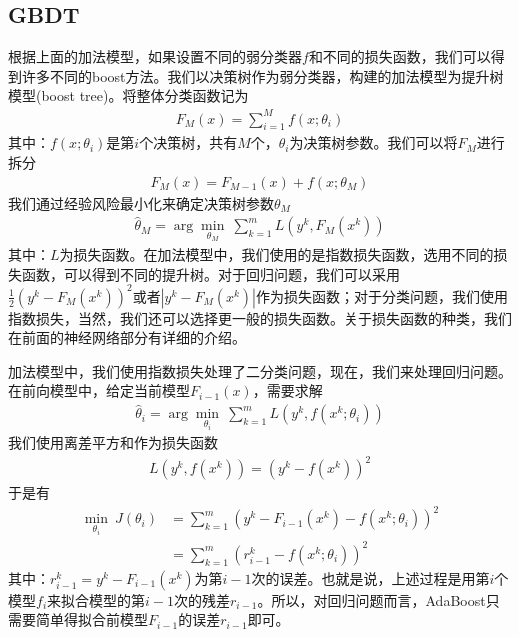       \subsection{GBDT}
          \par
          根据上面的加法模型，如果设置不同的弱分类器$f$和不同的损失函数，我们可以得到许多不同的boost方法。我们以决策树作为弱分类器，构建的加法模型为提升树模型(boost tree)。将整体分类函数记为
          \begin{align*}
          F_M(x) = \sum_{i=1}^M f(x;\theta_i)
          \end{align*}
          其中：$f(x;\theta_i)$是第$i$个决策树，共有$M$个，$\theta_i$为决策树参数。我们可以将$F_M$进行拆分
          \begin{align*}
          F_M(x) = F_{M-1}(x)+f(x;\theta_M)
          \end{align*}
          我们通过经验风险最小化来确定决策树参数$\theta_M$
          \begin{align*}
          \hat{\theta}_M = \arg\min_{\theta_M}\ \sum_{k=1}^m L(y^k,F_M(x^k))
          \end{align*}
          其中：$L$为损失函数。在加法模型中，我们使用的是指数损失函数，选用不同的损失函数，可以得到不同的提升树。对于回归问题，我们可以采用$\frac{1}{2}(y^k-F_M(x^k))^2$或者$|y^k -F_M(x^k)|$作为损失函数；对于分类问题，我们使用指数损失，当然，我们还可以选择更一般的损失函数。关于损失函数的种类，我们在前面的神经网络部分有详细的介绍。
          \par
          加法模型中，我们使用指数损失处理了二分类问题，现在，我们来处理回归问题。在前向模型中，给定当前模型$F_{i-1}(x)$，需要求解
          \begin{align*}
          \hat{\theta}_i = \arg\min_{\theta_i} \ \sum_{k=1}^m L(y^k,f(x^k;\theta_i))
          \end{align*}
          我们使用离差平方和作为损失函数
          \begin{align*}
          L(y^k,f(x^k)) = (y^k-f(x^k))^2
          \end{align*}
          于是有
          \begin{align*}
          \min_{\theta_i}\ J(\theta_i) & = \sum_{k=1}^m (y^k - F_{i-1}(x^k) -f(x^k;\theta_i))^2\\
          & = \sum_{k=1}^m (r_{i-1}^k - f(x^k;\theta_i))^2
          \end{align*}
          其中：$r_{i-1}^k = y^k - F_{i-1}(x^k)$为第$i-1$次的误差。也就是说，上述过程是用第$i$个模型$f_i$来拟合模型的第$i-1$次的残差$r_{i-1}$。所以，对回归问题而言，AdaBoost只需要简单得拟合前模型$F_{i-1}$的误差$r_{i-1}$即可。
